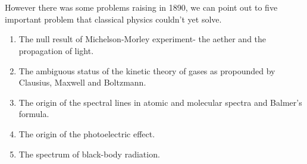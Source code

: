 \documentclass[9pt,a4paper, twocolumn]{article}
\newcounter{theo}
\begin{document}
        \\
        \\
        However there was some problems raising in 1890, we can point out to five important problem that classical physics couldn't yet solve.\
        \begin{enumerate}
            \item  The null result of Michelson-Morley experiment- the aether and the propagation of light.
            \item The ambiguous status of the kinetic theory of gases as propounded by Clausius, Maxwell and Boltzmann.
            \item The origin of the spectral lines in atomic and molecular spectra and Balmer's formula.
            \item The origin of the photoelectric effect.
            \item The spectrum of black-body radiation.
        \end{enumerate}
\end{document}
